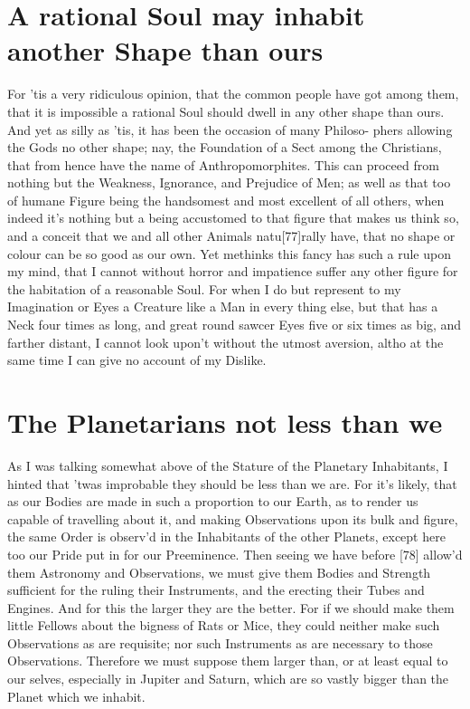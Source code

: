 \documentclass[letterpaper]{book}
\begin{document}
\section{A rational Soul may inhabit another Shape than ours}

For 'tis a very ridiculous opinion, that the common people have got among
them, that it is impossible a rational Soul should dwell in any other shape
than ours. And yet as silly as 'tis, it has been the occasion of many
Philoso- phers allowing the Gods no other shape; nay, the Foundation of a
Sect among the Christians, that from hence have the name of
Anthropomorphites. This can proceed from nothing but the Weakness,
Ignorance, and Prejudice of Men; as well as that too of humane Figure being
the handsomest and most excellent of all others, when indeed it's nothing
but a being accustomed to that figure that makes us think so, and a conceit
that we and all other Animals natu[77]rally have, that no shape or colour
can be so good as our own. Yet methinks this fancy has such a rule upon my
mind, that I cannot without horror and impatience suffer any other figure
for the habitation of a reasonable Soul. For when I do but represent to my
Imagination or Eyes a Creature like a Man in every thing else, but that has a
Neck four times as long, and great round sawcer Eyes five or six times as
big, and farther distant, I cannot look upon't without the utmost aversion,
altho at the same time I can give no account of my Dislike.


\section{The Planetarians not less than we}

As I was talking somewhat above of the Stature of the Planetary Inhabitants,
I hinted that 'twas improbable they should be less than we are. For it's
likely, that as our Bodies are made in such a proportion to our Earth, as to
render us capable of travelling about it, and making Observations upon its
bulk and figure, the same Order is observ'd in the Inhabitants of the other
Planets, except here too our Pride put in for our Preeminence. Then seeing
we have before [78] allow'd them Astronomy and Observations, we must
give them Bodies and Strength sufficient for the ruling their Instruments,
and the erecting their Tubes and Engines. And for this the larger they are
the better. For if we should make them little Fellows about the bigness of
Rats or Mice, they could neither make such Observations as are requisite;
nor such Instruments as are necessary to those Observations. Therefore we
must suppose them larger than, or at least equal to our selves, especially
in Jupiter and Saturn, which are so vastly bigger than the Planet which we
inhabit.
\end{document}
